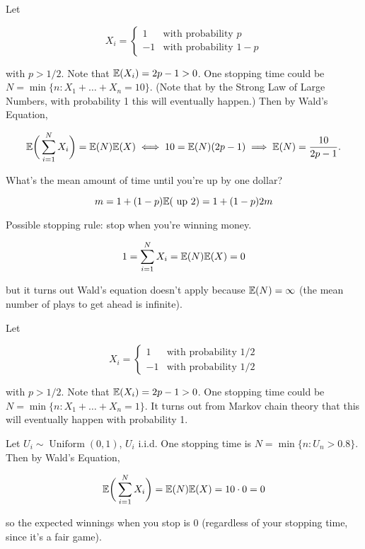 \begin{example} Let

\[
X_i = \begin{cases}
1 & \text{with probability } p \\
-1 & \text{with probability } 1 -p
\end{cases}
\]

with \(p > 1/2\). Note that \(\E(X_i) = 2p - 1 > 0\). One stopping time could be \(N = \min\{n: X_1 + \ldots + X_n = 10\}\). (Note that by the Strong Law of Large Numbers, with probability 1 this will eventually happen.) Then by Wald's Equation,

\[
\E \bigg( \sum_{i=1}^N X_i \bigg) = \E(N) \E(X) \iff 10 = \E(N) (2p-1) \implies \E(N) = \frac{10}{2p-1}.
\]

What's the mean amount of time until you're up by one dollar?

\[
m = 1 + (1-p) \E( \text{ up } 2) = 1 + (1-p)2m
\]

Possible stopping rule: stop when you're winning money.

\[
1 = \sum_{i=1}^N X_i = \E(N) \E(X) =0
\]

but it turns out Wald's equation doesn't apply because \(\E(N) = \infty\) (the mean number of plays to get ahead is infinite).

\end{example}

\begin{example} Let

\[
X_i = \begin{cases}
1 & \text{with probability } 1/2 \\
-1 & \text{with probability } 1/2
\end{cases}
\]

with \(p > 1/2\). Note that \(\E(X_i) = 2p - 1 > 0\). One stopping time could be \(N = \min\{n: X_1 + \ldots + X_n = 1\}\). It turns out from Markov chain theory that this will eventually happen with probability 1.

\end{example}

\begin{example} Let \(U_i \sim \operatorname{Uniform}(0,1)\), \(U_i\) i.i.d. One stopping time is \(N = \min\{n: U_n > 0.8\}\). Then by Wald's Equation,

\[
\E \bigg( \sum_{i=1}^N X_i \bigg) = \E(N) \E(X) = 10 \cdot 0 = 0
\]

so the expected winnings when you stop is 0 (regardless of your stopping time, since it's a fair game).


\end{example}

